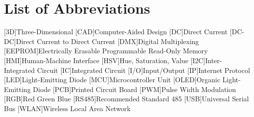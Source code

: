 {}

\section*{List of Abbreviations}
\begin{acronym}[1234567890]\itemsep1pt
	[3D]{Three-Dimensional}
	[CAD]{Computer-Aided Design}
	[DC]{Direct Current}
	[DC-DC]{Direct Current to Direct Current}
	[DMX]{Digital Multiplexing}
	[EEPROM]{Electrically Erasable Programmable Read-Only Memory}
	[HMI]{Human-Machine Interface}
	[HSV]{Hue, Saturation, Value}
	[I2C]{Inter-Integrated Circuit}
	[IC]{Integrated Circuit}
	[I/O]{Input/Output}
	[IP]{Internet Protocol}
	[LED]{Light-Emitting Diode}
	[MCU]{Microcontroller Unit}
	[OLED]{Organic Light-Emitting Diode}
	[PCB]{Printed Circuit Board}
	[PWM]{Pulse Width Modulation}
	[RGB]{Red Green Blue}
	[RS485]{Recommended Standard 485}
	[USB]{Universal Serial Bus}
	[WLAN]{Wireless Local Area Network}
\end{acronym}

